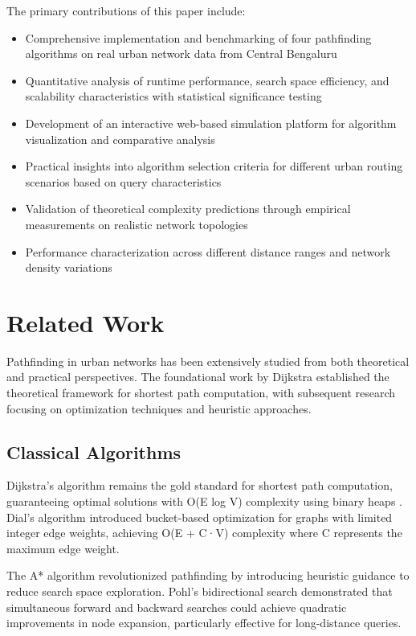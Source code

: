\documentclass[conference]{IEEEtran}
\begin{document}
The primary contributions of this paper include:
\begin{itemize}
\item Comprehensive implementation and benchmarking of four pathfinding algorithms on real urban network data from Central Bengaluru
\item Quantitative analysis of runtime performance, search space efficiency, and scalability characteristics with statistical significance testing
\item Development of an interactive web-based simulation platform for algorithm visualization and comparative analysis
\item Practical insights into algorithm selection criteria for different urban routing scenarios based on query characteristics
\item Validation of theoretical complexity predictions through empirical measurements on realistic network topologies
\item Performance characterization across different distance ranges and network density variations
\end{itemize}

\section{Related Work}

Pathfinding in urban networks has been extensively studied from both theoretical and practical perspectives. The foundational work by Dijkstra \cite{dijkstra1959note} established the theoretical framework for shortest path computation, with subsequent research focusing on optimization techniques and heuristic approaches.

\subsection{Classical Algorithms}

Dijkstra's algorithm remains the gold standard for shortest path computation, guaranteeing optimal solutions with O(E log V) complexity using binary heaps \cite{cormen2009introduction}. Dial's algorithm \cite{dial1969algorithm} introduced bucket-based optimization for graphs with limited integer edge weights, achieving O(E + C·V) complexity where C represents the maximum edge weight.

The A* algorithm \cite{hart1968formal} revolutionized pathfinding by introducing heuristic guidance to reduce search space exploration. Pohl's bidirectional search \cite{pohl1971bidirectional} demonstrated that simultaneous forward and backward searches could achieve quadratic improvements in node expansion, particularly effective for long-distance queries.
\end{document}
